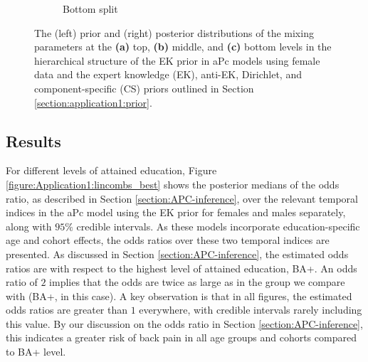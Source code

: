 \begin{figure}[!ht]
\begin{subfigure}[b]{0.8\textwidth}
        \caption[]%
        {{\small  Bottom split}}    
        \label{figure:Application1:s3_f}
    \end{subfigure}
    \vspace{-0.2cm}
    \caption{The (left) prior and (right) posterior distributions of the mixing parameters at the \textbf{(a)} top, \textbf{(b)} middle, and \textbf{(c)} bottom levels in the hierarchical structure of the EK prior in aPc models using female data and the expert knowledge (EK), anti-EK, Dirichlet, and component-specific (CS) priors outlined in Section \ref{section:application1:prior}. }
    \label{fig:application1:compare-plots_f}
\end{figure}

\FloatBarrier
\subsection{Results}\label{section:application1:results}
\vspace{-0.2cm}
For different levels of attained education, Figure \ref{figure:Application1:lincombs_best} shows the posterior medians of the odds ratio, as described in Section \ref{section:APC-inference}, over the relevant temporal indices in the aPc model using the EK prior for females and males separately, along with $95\%$ credible intervals. As these models incorporate education-specific age and cohort effects, the odds ratios over these two temporal indices are presented. As discussed in Section \ref{section:APC-inference}, the estimated odds ratios are with respect to the highest level of attained education, BA+. An odds ratio of $2$ implies that the odds are twice as large as in the group we compare with (BA+, in this case). A key observation is that in all figures, the estimated odds ratios are greater than $1$ everywhere, with credible intervals rarely including this value. By our discussion on the odds ratio in Section \ref{section:APC-inference}, this indicates a greater risk of back pain in all age groups and cohorts compared to BA+ level.


